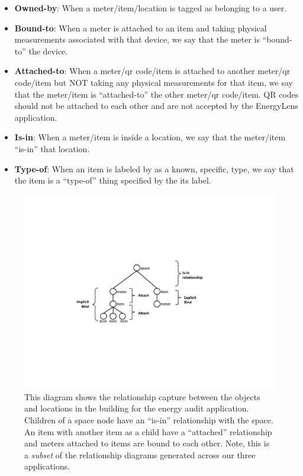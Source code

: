 \begin{itemize}
\item {\bf Owned-by}: When a meter/item/location is tagged as belonging to a user.
\item {\bf Bound-to}: When a meter is attached to an item and taking physical measurements associated with that 
		device, we say that the meter is ``bound-to'' the device.
\item {\bf Attached-to}: When a meter/qr code/item is attached to another meter/qr code/item but NOT taking any 
		physical measurements for that item, we say that the meter/item is ``attached-to'' the other meter/qr 
		code/item.  QR codes should not be attached to each other and are not accepted by the EnergyLens application.
\item {\bf Is-in}: When a meter/item is inside a location, we say that the meter/item ``is-in'' that location.
\item {\bf Type-of}: When an item is labeled by as a known, specific, type, we say that the item is a ``type-of'' thing 
		specified by the its label.
\end{itemize}


\begin{figure}[htb!]
\begin{center}
\includegraphics[scale=0.55]{figs/bindattachstructs}
\caption{This diagram shows the relationship capture between the objects and locations in the building for the 
energy audit application.  Children of a space node have an ``is-in'' relationship with the space.  An item
with another item as a child have a ``attached'' relationship and meters attached to items are bound to each other.
Note, this is a \emph{subset} of the relationship diagrams generated across our three applications.}
\label{fig:attachandbind}
\end{center}
\end{figure}

